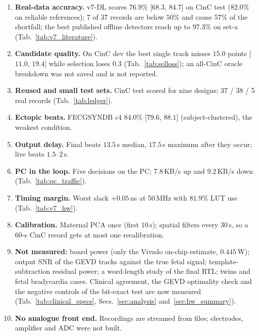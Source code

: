 \begin{enumerate}
    \item \textbf{Real-data accuracy.} v7-DL scores $76.9\%$ [$68.3$, $84.7$] on CinC test ($82.0\%$ on reliable references); 7 of 37 records are below $50\%$ and cause $57\%$ of the shortfall; the best published offline detectors reach up to $97.3\%$ on set-a (Tab.~\ref{tab:v7_literature}). %
    \item \textbf{Candidate quality.} On CinC dev the best single track misses $15.0$ points [$11.0$, $19.4$] while selection loses $0.3$ (Tab.~\ref{tab:selloss}); an all-CinC oracle breakdown was not saved and is not reported. %
    \item \textbf{Reused and small test sets.} CinC test scored for nine designs; 37 / 38 / 5 real records (Tab.~\ref{tab:ledger}).
    \item \textbf{Ectopic beats.} FECGSYNDB $c4$ $84.0\%$ [$79.6$, $88.1$] (subject-clustered), the weakest condition. %
    \item \textbf{Output delay.} Final beats $13.5\,$s median, $17.5\,$s maximum after they occur; live beats $1.5$--$2\,$s.
    \item \textbf{PC in the loop.} Five decisions on the PC; 7.8\,KB/s up and 9.2\,KB/s down (Tab.~\ref{tab:pc_traffic}). %
    \item \textbf{Timing margin.} Worst slack $+0.05\,$ns at 50\,MHz with $81.9\%$ LUT use (Tab.~\ref{tab:v7_hw}). %
    \item \textbf{Calibration.} Maternal PCA once (first $10\,$s); spatial filters every $30\,$s, so a 60-s CinC record gets at most one recalibration.
    \item \textbf{Not measured:} board power (only the Vivado on-chip estimate, $0.445\,$W); output SNR of the GEVD tracks against the true fetal signal; template-subtraction residual power; a word-length study of the final RTL; twins and fetal bradycardia cases. Clinical agreement, the GEVD optimality check and the negative controls of the bit-exact test are now measured (Tab.~\ref{tab:clinical_specs}, Secs.~\ref{sec:analysis} and~\ref{sec:hw_summary}).
    \item \textbf{No analogue front end.} Recordings are streamed from files; electrodes, amplifier and ADC were not built.
\end{enumerate}
